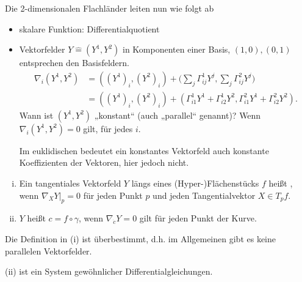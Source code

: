 

Die 2-dimensionalen Flachländer leiten nun wie folgt ab
\begin{itemize}
	\item
		skalare Funktion: Differentialquotient
	\item
		Vektorfelder $Y \hat = (Y^1, Y^2)$ in Komponenten einer Basis, $(1, 0), (0, 1)$ entsprechen den Basisfeldern.
		\begin{align*}
			\nabla_i (Y^1, Y^2)
			&= ((Y^1)_i, (Y^2)_i)
				+ \Big( \sum_{j} \Gamma_{ij}^1 Y^j, \sum_{j} \Gamma_{ij}^2 Y^j \Big) \\
			&= ((Y^1)_i, (Y^2)_i)
				+ (\Gamma_{i1}^1 Y^1 + \Gamma_{i2}^1 Y^2, \Gamma_{i1}^2 Y^1 + \Gamma_{i2}^2 Y^2).
		\end{align*}
		Wann ist $(Y^1, Y^2)$ „konstant“ (auch „parallel“ genannt)? 
		Wenn $\nabla_i(Y^1, Y^2) = 0$ gilt, für jedes $i$.

		Im euklidischen bedeutet ein konstantes Vektorfeld auch konstante Koeffizienten der Vektoren, hier jedoch nicht.
\end{itemize}

\begin{df}[parallel]
	\begin{enumerate}[(i)]
		\item
			Ein tangentiales Vektorfeld $Y$ längs eines (Hyper-)Flächenstücks $f$ heißt , wenn $\nabla_X Y|_p = 0$ für jeden Punkt $p$ und jeden Tangentialvektor $X \in T_pf$.
		\item
			$Y$ heißt  $c = f \circ \gamma$, wenn $\nabla_{\dot c} Y = 0$ gilt für jeden Punkt der Kurve.
	\end{enumerate}
	\begin{note}
		Die Definition in (i) ist überbestimmt, d.h. im Allgemeinen gibt es keine parallelen Vektorfelder.

		(ii) ist ein System gewöhnlicher Differentialgleichungen.
	\end{note}
\end{df}

